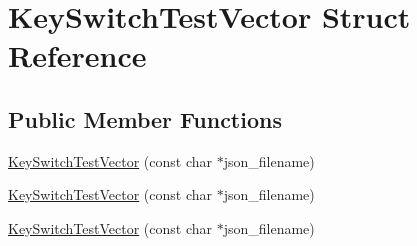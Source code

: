 \hypertarget{structKeySwitchTestVector}{\section{Key\-Switch\-Test\-Vector Struct Reference}
\label{structKeySwitchTestVector}
}
\subsection*{Public Member Functions}
\begin{DoxyCompactItemize}
\item 
\hyperlink{structKeySwitchTestVector_a6250ec29fdab16360c0f956fcae55b40}{Key\-Switch\-Test\-Vector} (const char $\ast$json\-\_\-filename)
\item 
\hyperlink{structKeySwitchTestVector_a6250ec29fdab16360c0f956fcae55b40}{Key\-Switch\-Test\-Vector} (const char $\ast$json\-\_\-filename)
\item 
\hyperlink{structKeySwitchTestVector_a6250ec29fdab16360c0f956fcae55b40}{Key\-Switch\-Test\-Vector} (const char $\ast$json\-\_\-filename)
\end{DoxyCompactItemize}
